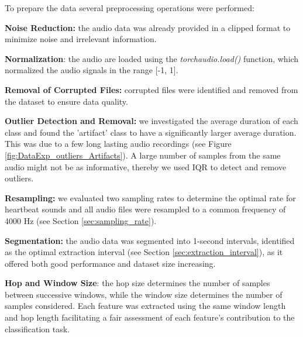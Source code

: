 To prepare the data several preprocessing operations were performed:

\vspace{0.2cm}\noindent
\textbf{Noise Reduction:} the audio data was already provided in a clipped format 
to minimize noise and irrelevant information.

\vspace{0.2cm}\noindent
\textbf{Normalization}: the audio are loaded using the \textit{torchaudio.load()} 
function, which normalized the audio signals in the range [-1, 1]. 

\vspace{0.2cm}\noindent
\textbf{Removal of Corrupted Files:} corrupted files were identified and removed 
from the dataset to ensure data quality.

\vspace{0.2cm}\noindent
\textbf{Outlier Detection and Removal:} we investigated the average duration of 
each class and found the 'artifact' class to have a significantly larger average 
duration. This was due to a few long lasting audio 
recordings (see Figure \ref{fig:DataExp_outliers_Artifacts}). A large number of samples from 
the same audio might not be as informative, thereby we used IQR to detect and remove outliers.

\vspace{0.2cm}\noindent
\textbf{Resampling:} we evaluated two sampling rates to determine the optimal rate 
for heartbeat sounds and all audio files were resampled to a common frequency of 4000 Hz 
(see Section \ref{sec:sampling_rate}).

\vspace{0.2cm}\noindent
\textbf{Segmentation:} the audio data was segmented into 1-second intervals, 
identified as the optimal extraction interval (see Section \ref{sec:extraction_interval}), as
it offered both good performance and dataset size increasing.

\vspace{0.2cm}\noindent
\textbf{Hop and Window Size}: the hop size determines the number of samples between 
successive windows, while the window size determines the number of samples considered. 
Each feature was extracted using the same window length and hop length facilitating a 
fair assessment of each feature's contribution to the classification task. 

